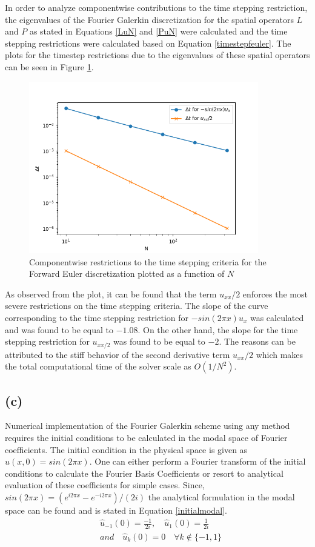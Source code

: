 \documentclass[12pt]{article}
\begin{document}
In order to analyze componentwise contributions to the time stepping restriction, the eigenvalues of the Fourier Galerkin discretization for the spatial operators $L$ and $P$ as stated in Equations \ref{LuN} and \ref{PuN} were calculated and the time stepping restrictions were calculated based on Equation \ref{timestepfeuler}. The plots for the timestep restrictions due to the eigenvalues of these spatial operators can be seen in Figure \ref{fig:componentwise_restriction}.
\begin{figure}
    \centering
    \includegraphics[width=10cm]{dtComponentwise_Q1.png}
    \caption{Componentwise restrictions to the time stepping criteria for the Forward Euler discretization plotted as a function of $N$}
    \label{fig:componentwise_restriction}
\end{figure}
As observed from the plot, it can be found that the term $u_{xx}/2$ enforces the most severe restrictions on the time stepping criteria. The slope of the curve corresponding to the time stepping restriction for $-sin(2 \pi x)u_x$ was calculated and was found to be equal to $-1.08$. On the other hand, the slope for the time stepping restriction for $u_{xx/2}$ was found to be equal to $-2$. The reasons can be attributed to the stiff behavior of the second derivative term $u_{xx}/2$ which makes the total computational time of the solver scale as $O(1/N^2)$.  
\subsection{(c)}
Numerical implementation of the Fourier Galerkin scheme using any method requires the initial conditions to be calculated in the modal space of Fourier coefficients. The initial condition in the physical space is given as $u(x, 0) = sin(2 \pi x)$. One can either perform a Fourier transform of the initial conditions to calculate the Fourier Basis Coefficients or resort to analytical evaluation of these coefficients for simple cases. Since, $sin(2 \pi x) = (e^{i 2 \pi x} - e^{-i 2 \pi x})/(2i)$ the analytical formulation in the modal space can be found and is stated in Equation \ref{initialmodal}.
\begin{equation}
    \begin{aligned}
        & \hat{u}_{-1}(0) = \frac{-1}{2i}, \quad \hat{u}_{1}(0) = \frac{1}{2i} \\
        & and \quad \hat{u}_k(0) = 0 \quad \forall k \notin \{ -1, 1 \}
    \end{aligned}
    \label{initialmodal}
\end{equation}
\end{document}
